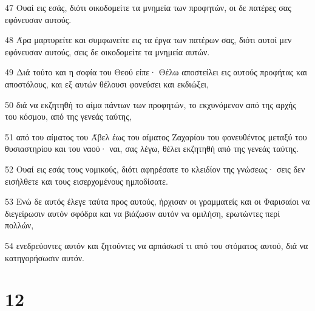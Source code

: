 \par 47 Ουαί εις εσάς, διότι οικοδομείτε τα μνημεία των προφητών, οι δε πατέρες σας εφόνευσαν αυτούς.
\par 48 Άρα μαρτυρείτε και συμφωνείτε εις τα έργα των πατέρων σας, διότι αυτοί μεν εφόνευσαν αυτούς, σεις δε οικοδομείτε τα μνημεία αυτών.
\par 49 Διά τούτο και η σοφία του Θεού είπε· Θέλω αποστείλει εις αυτούς προφήτας και αποστόλους, και εξ αυτών θέλουσι φονεύσει και εκδιώξει,
\par 50 διά να εκζητηθή το αίμα πάντων των προφητών, το εκχυνόμενον από της αρχής του κόσμου, από της γενεάς ταύτης,
\par 51 από του αίματος του Άβελ έως του αίματος Ζαχαρίου του φονευθέντος μεταξύ του θυσιαστηρίου και του ναού· ναι, σας λέγω, θέλει εκζητηθή από της γενεάς ταύτης.
\par 52 Ουαί εις εσάς τους νομικούς, διότι αφηρέσατε το κλειδίον της γνώσεως· σεις δεν εισήλθετε και τους εισερχομένους ημποδίσατε.
\par 53 Ενώ δε αυτός έλεγε ταύτα προς αυτούς, ήρχισαν οι γραμματείς και οι Φαρισαίοι να διεγείρωσιν αυτόν σφόδρα και να βιάζωσιν αυτόν να ομιλήση, ερωτώντες περί πολλών,
\par 54 ενεδρεύοντες αυτόν και ζητούντες να αρπάσωσί τι από του στόματος αυτού, διά να κατηγορήσωσιν αυτόν.

\chapter{12}

